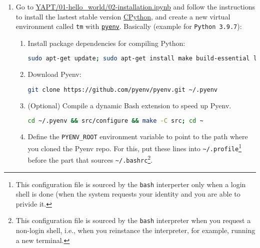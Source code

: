 \begin{enumerate}
    
\item Go to
  \href{https://github.com/vicente-gonzalez-ruiz/YAPT/blob/master/01-hello_world/02-installation.ipynb}{YAPT/01-hello\_world/02-installation.ipynb}
  \cite{YAPT} and follow the instructions to install the lastest
  stable version
  \href{https://en.wikipedia.org/wiki/CPython}{CPython}, and create
  a new virtual environment called \texttt{tm} with
  \href{https://github.com/pyenv/pyenv}{\texttt{pyenv}}. Basically
  (example for \verb|Python 3.9.7|):
  
  \begin{enumerate}
  \item Install package dependencies for compiling Python:
    
    \begin{lstlisting}[mathescape=false, language=Bash]
      sudo apt-get update; sudo apt-get install make build-essential libssl-dev zlib1g-dev libbz2-dev libreadline-dev libsqlite3-dev wget curl llvm libncursesw5-dev xz-utils tk-dev libxml2-dev libxmlsec1-dev libffi-dev liblzma-dev
\end{lstlisting}
    
  \item Download Pyenv:
    \begin{lstlisting}[mathescape=false, language=Bash]
      git clone https://github.com/pyenv/pyenv.git ~/.pyenv
    \end{lstlisting}
    
  \item (Optional) Compile a dynamic Bash extension to speed up Pyenv.
    \begin{lstlisting}[mathescape=false, language=Bash]
      cd ~/.pyenv && src/configure && make -C src; cd ~
    \end{lstlisting}
    
  \item Define the \verb|PYENV_ROOT| environment variable to point to
    the path where you cloned the Pyenv repo. For this, put these lines
    into \verb|~/.profile|\footnote{This configuration file is sourced
    by the \texttt{bash} interperter only when a login shell is done
    (when the system requests your identity and you are able to
    privide it.} before the part that sources
    \verb|~/.bashrc|\footnote{This configuration file is sourced by the
    \texttt{bash} interpreter when you request a non-login shell, i.e.,
    when you reinstance the interpreter, for example, running a new
    terminal.}.
    

\end{enumerate}
\end{enumerate}
